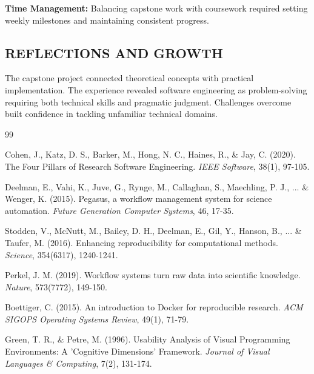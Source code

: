 \documentclass[12pt]{article}
\begin{document}
\textbf{Time Management:} Balancing capstone work with coursework required setting weekly milestones and maintaining consistent progress.

\subsection{REFLECTIONS AND GROWTH}

The capstone project connected theoretical concepts with practical implementation. The experience revealed software engineering as problem-solving requiring both technical skills and pragmatic judgment. Challenges overcome built confidence in tackling unfamiliar technical domains.

\newpage
\begin{thebibliography}{99}

Cohen, J., Katz, D. S., Barker, M., Hong, N. C., Haines, R., \& Jay, C. (2020). The Four Pillars of Research Software Engineering. \textit{IEEE Software}, 38(1), 97-105.

Deelman, E., Vahi, K., Juve, G., Rynge, M., Callaghan, S., Maechling, P. J., ... \& Wenger, K. (2015). Pegasus, a workflow management system for science automation. \textit{Future Generation Computer Systems}, 46, 17-35.

Stodden, V., McNutt, M., Bailey, D. H., Deelman, E., Gil, Y., Hanson, B., ... \& Taufer, M. (2016). Enhancing reproducibility for computational methods. \textit{Science}, 354(6317), 1240-1241.

Perkel, J. M. (2019). Workflow systems turn raw data into scientific knowledge. \textit{Nature}, 573(7772), 149-150.

Boettiger, C. (2015). An introduction to Docker for reproducible research. \textit{ACM SIGOPS Operating Systems Review}, 49(1), 71-79.

Green, T. R., \& Petre, M. (1996). Usability Analysis of Visual Programming Environments: A 'Cognitive Dimensions' Framework. \textit{Journal of Visual Languages \& Computing}, 7(2), 131-174.




\end{thebibliography}
\end{document}
